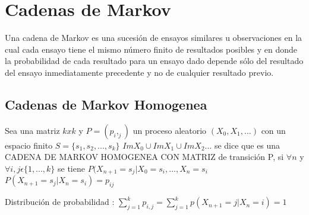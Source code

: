 \chapter{Cadenas de Markov}



Una cadena de Markov es una sucesi\'on de ensayos similares u observaciones en la cual cada ensayo tiene el mismo n\'umero finito de resultados posibles y en donde la probabilidad de cada resultado para un ensayo dado depende s\'olo del resultado del ensayo inmediatamente precedente y no de cualquier resultado previo.


\section{Cadenas de Markov Homogenea}

Sea una matriz $k x k$ y $P = (p_i,_j)$ un proceso aleatorio $(X_0,X_1,...)$ con un espacio finito $S = \{s_1,s_2,...,s_k\}$ $ Im X_0 \cup Im X_1 \cup ImX_2$... se dice que es una CADENA DE MARKOV HOMOGENEA CON MATRIZ de transici\'on P, si $\forall n$ y $\forall i,j \epsilon \{1,...,k\} $ se tiene $P(X_{n +1} = s_j | X_0 = s_i,..., X_n = s_i$\\
$ P (X_{n+1} = s_j | X_n = s_i) = p_{ij}$


Distribuci\'on de probabilidad :
$\sum_{j = 1}^{k}p_{i,j} = \sum_{j = 1}^k p(X_{n +1} = j | X_n = i) = 1$




